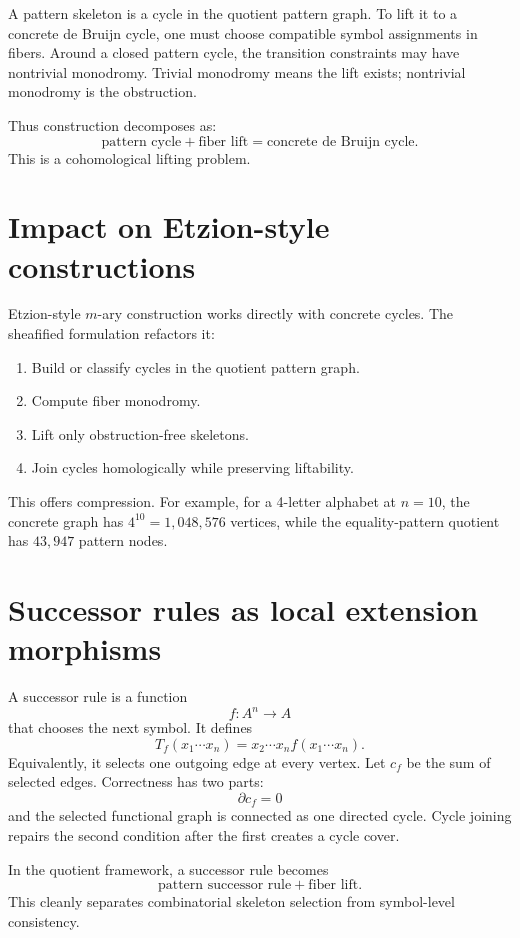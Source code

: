 \documentclass[11pt]{article}
\begin{document}
A pattern skeleton is a cycle in the quotient pattern graph. To lift it to a concrete de Bruijn cycle, one must choose compatible symbol assignments in fibers. Around a closed pattern cycle, the transition constraints may have nontrivial monodromy. Trivial monodromy means the lift exists; nontrivial monodromy is the obstruction.

Thus construction decomposes as:
\[
\text{pattern cycle}+\text{fiber lift}=\text{concrete de Bruijn cycle}.
\]
This is a cohomological lifting problem.

\section{Impact on Etzion-style constructions}

Etzion-style \(m\)-ary construction works directly with concrete cycles. The sheafified formulation refactors it:
\begin{enumerate}[label=\arabic*.]
\item Build or classify cycles in the quotient pattern graph.
\item Compute fiber monodromy.
\item Lift only obstruction-free skeletons.
\item Join cycles homologically while preserving liftability.
\end{enumerate}
This offers compression. For example, for a 4-letter alphabet at \(n=10\), the concrete graph has \(4^{10}=1{,}048{,}576\) vertices, while the equality-pattern quotient has \(43{,}947\) pattern nodes.

\section{Successor rules as local extension morphisms}

A successor rule is a function
\[
f:A^n\to A
\]
that chooses the next symbol. It defines
\[
T_f(x_1\cdots x_n)=x_2\cdots x_n f(x_1\cdots x_n).
\]
Equivalently, it selects one outgoing edge at every vertex. Let \(c_f\) be the sum of selected edges. Correctness has two parts:
\[
\partial c_f=0
\]
and the selected functional graph is connected as one directed cycle. Cycle joining repairs the second condition after the first creates a cycle cover.

In the quotient framework, a successor rule becomes
\[
\text{pattern successor rule}+\text{fiber lift}.
\]
This cleanly separates combinatorial skeleton selection from symbol-level consistency.
\end{document}
